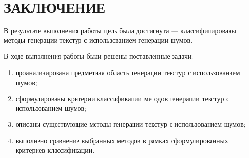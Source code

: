 \chapter*{ЗАКЛЮЧЕНИЕ}

В результате выполнения работы цель была достигнута --- классифицированы методы генерации текстур с использованием генерации шумов.

В ходе выполнения работы были решены поставленные задачи:
\begin{enumerate}
	\item проанализирована предметная область генерации текстур с использованием шумов;
	\item сформулированы критерии классификации методов генерации текстур с использованием шумов;
	\item описаны существующие методы генерации текстур с использованием шумов;
	\item выполнено сравнение выбранных методов в рамках сформулированных критериев классификации.
\end{enumerate}